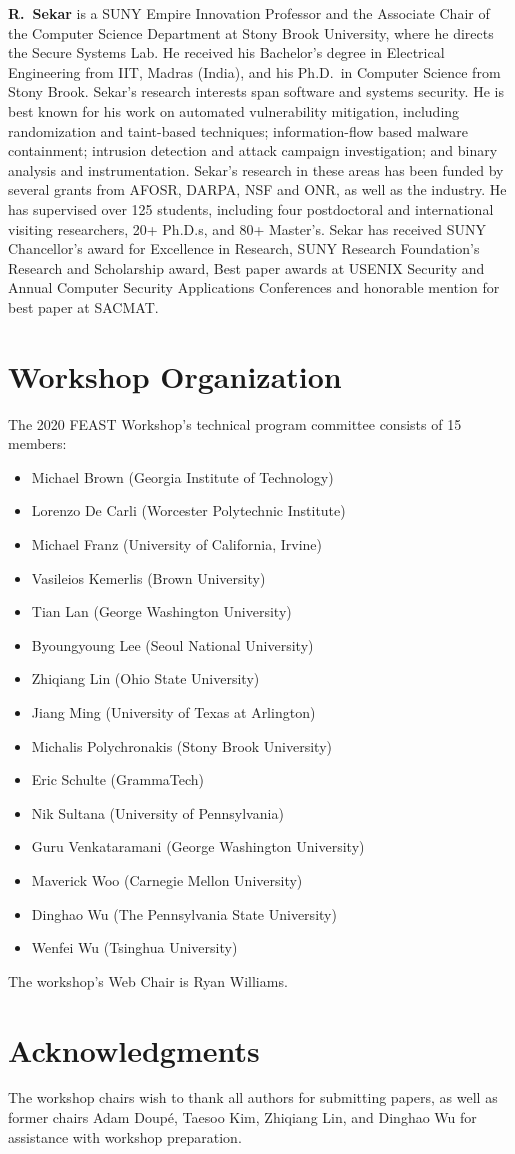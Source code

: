 \documentclass[sigconf]{acmart}
\newcommand\bio[1]{\noindent\textbf{#1}}
\begin{document}
\medskip

\bio{R.~Sekar}
is a SUNY Empire Innovation Professor and the Associate Chair of the Computer Science Department at Stony Brook University, where he directs the Secure Systems Lab. He received his Bachelor's degree in Electrical Engineering from IIT, Madras (India), and his Ph.D.~in Computer Science from Stony Brook. Sekar's research interests span software and systems security. He is best known for his work on automated vulnerability mitigation, including randomization and taint-based techniques; information-flow based malware containment; intrusion detection and attack campaign investigation; and binary analysis and instrumentation. Sekar's research in these areas has been funded by several grants from AFOSR, DARPA, NSF and ONR, as well as the industry. He has supervised over 125 students, including four postdoctoral and international visiting researchers, 20+ Ph.D.s, and 80+ Master's. Sekar has received SUNY Chancellor's award for Excellence in Research, SUNY Research Foundation's Research and Scholarship award, Best paper awards at USENIX Security and Annual Computer Security Applications Conferences and honorable mention for best paper at SACMAT\@.

\section{Workshop Organization}
The 2020 FEAST Workshop's technical program committee consists of 15 members:
\begin{itemize}
  \item Michael Brown (Georgia Institute of Technology)
  \item Lorenzo De Carli (Worcester Polytechnic Institute)
  \item Michael Franz (University of California, Irvine)
  \item Vasileios Kemerlis (Brown University)
  \item Tian Lan (George Washington University)
  \item Byoungyoung Lee (Seoul National University)
  \item Zhiqiang Lin (Ohio State University)
  \item Jiang Ming (University of Texas at Arlington)
  \item Michalis Polychronakis (Stony Brook University)
  \item Eric Schulte (GrammaTech)
  \item Nik Sultana (University of Pennsylvania)
  \item Guru Venkataramani (George Washington University)
  \item Maverick Woo (Carnegie Mellon University)
  \item Dinghao Wu (The Pennsylvania State University)
  \item Wenfei Wu (Tsinghua University)
\end{itemize}
The workshop's Web Chair is Ryan Williams.

\section{Acknowledgments}
The workshop chairs wish to thank all authors for submitting papers,
as well as former chairs
Adam Doup\'e, Taesoo Kim, Zhiqiang Lin, and Dinghao Wu
for assistance with workshop preparation.



\end{document}
